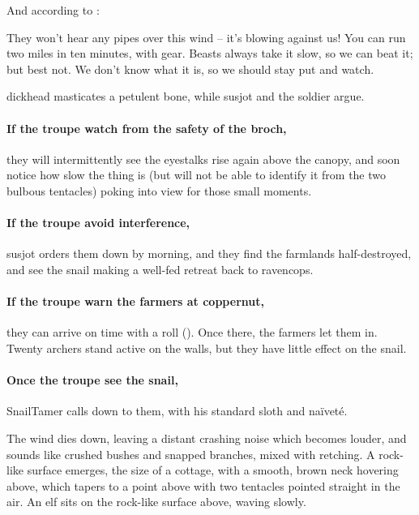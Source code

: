 And according to :

\begin{speechtext}
  They won't hear any pipes over this wind -- it's blowing against us!
  You can run two miles in ten minutes, with gear.
  Beasts always take it slow, so we can beat it; but best not.
  We don't know what it is, so we should stay put and watch.
\end{speechtext}

\begin{boxtext}
  \Gls{dickhead} masticates a petulent bone, while \gls{susjot} and the \gls{soldier} argue.
\end{boxtext}

\paragraph{If the troupe watch from the safety of the \gls{broch},}
they will intermittently see the eyestalks rise again above the canopy, and soon notice how slow the thing is (but will not be able to identify it from the two bulbous tentacles) poking into view for those small moments.

\paragraph{If the troupe avoid interference,}
\gls{susjot} orders them down by morning, and they find the farmlands half-destroyed, and see the snail making a well-fed retreat back to \gls{ravencops}.

\paragraph{If the troupe warn the farmers at \gls{coppernut},}
they can arrive on time with a  roll (\tn[5]).
Once there, the farmers let them in.
Twenty archers stand active on the walls, but they have little effect on the snail.

\paragraph{Once the troupe see the snail,}
\gls{SnailTamer} calls down to them, with his standard sloth and na\"ivet\'e.

\begin{boxtext}
  The wind dies down, leaving a distant crashing noise which becomes louder, and sounds like crushed bushes and snapped branches, mixed with  retching.
  A rock-like surface emerges, the size of a cottage, with a smooth, brown neck hovering above, which tapers to a point above with two tentacles pointed straight in the air.
  An elf sits on the rock-like surface above, waving slowly.
\end{boxtext}

